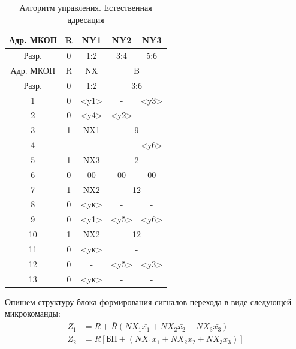 \documentclass[a4paper,14pt]{extarticle}
\begin{document}
\begin{table}[htpb]
\centering
	\begin{tabular}{|c|c|c|c|c|}
		\hline
		Адр. МКОП & R & NY1 & NY2& NY3 \\ \hline
		Разр. & 0 & 1:2 & 3:4 & 5:6 \\ \hline
		Адр. МКОП & R & NX & \multicolumn{ 2}{c|}{B}  \\ \hline
		Разр. & 0 & 1:2 & \multicolumn{ 2}{c|}{3:6} \\ \hline
		1 & 0 & <y1> & {-} & <y3>\\ \hline
		2 & 0 & <y4> & <y2> & - \\ \hline
		3 & 1 & NX1 & \multicolumn{ 2}{c|}{9}  \\ \hline
		4 & - & - & - & <y6>\\ \hline
		5 & 1 & NX3 & \multicolumn{ 2}{c|}{2}  \\ \hline
		6 & 0 & 00 & {00} & {00} \\ \hline
		7 & 1 & NX2 & \multicolumn{ 2}{c|}{12} \\ \hline
		8 & 0 & <yк> & {-} & {-} \\ \hline
		9 & 0 & <y1> & <y5> & <y6> \\ \hline
		10 & 1 & NX2 & \multicolumn{ 2}{c|}{12} \\ \hline
		11 & 0 & <yк> & \multicolumn{ 2}{c|}{-} \\ \hline
		12 & 0 & - & <y5> & <y3> \\ \hline
		13 & 0 & <yк> & - & - \\ \hline
	\end{tabular}
	\caption{Алгоритм управления. Естественная адресация }
	\label{tab:manage-algorithm2}
\end{table}

Опишем структуру блока формирования сигналов перехода в виде следующей
микрокоманды:
\begin{align*}
	Z_1 & =R + \bar{R}\left(NX_1\bar{x_1}+NX_2\bar{x_2}+NX_3\bar{x_3}\right) \\
	Z_2 & = R\left[БП + \left(NX_1x_1+NX_2x_2+NX_3x_3\right)\right]
\end{align*}
\end{document}
